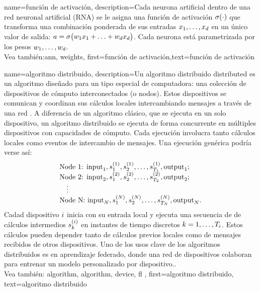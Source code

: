 {name={función de activación},
	description={Cada neurona artificial dentro de una red neuronal artificial (RNA) se le asigna 
		una función de activación $\sigma(\cdot)$ que transforma una combinación ponderada de 
		sus entradas $x_{1},\ldots,x_{d}$ en un único valor de salida: 
		$a = \sigma\big(w_{1} x_{1}+\ldots+w_{d} x_{d} \big)$. 
		Cada neurona está parametrizada por los pesos $w_{1},\ldots,w_{d}$.
		\\
		 Vea también:\gls{ann}, \gls{weights}},
first={función de activación},text={función de activación} 
}

{name={algoritmo distribuido},
	description={Un algoritmo distribuido distributed es un algoritmo diseñado para 
		un tipo especial de computadora: una colección de dispositivos de cómputo interconectados (o nodos). 
		Estos dispositivos se comunican y coordinan sus cálculos locales intercambiando mensajes
		a través de una red \cite{IntroDistAlg,ParallelDistrBook}. A diferencia de un algoritmo clásico,
		que se ejecuta en un solo dispositivo, un algoritmo distribuido   
		se ejecuta de forma concurrente en múltiples dispositivos con capacidades de cómputo. 
		Cada ejecución involucra tanto cálculos locales como eventos de intercambio de mensajes. 
		Una ejecución genérica podría verse así: 
		\[
		\begin{array}{l}
			\text{Node 1: } {\rm input}_1, s_1^{(1)}, s_2^{(1)}, \ldots, s_{T_1}^{(1)}, {\rm output}_1; \\
			\text{Node 2: } {\rm input}_2, s_1^{(2)}, s_2^{(2)}, \ldots, s_{T_2}^{(2)}, {\rm output}_2; \\
			\quad \vdots \\
			\text{Node N: } {\rm input}_N, s_1^{(N)}, s_2^{(N)}, \ldots, s_{T_N}^{(N)}, {\rm output}_N.
		\end{array}
		\]
		Cadad dispositivo  $i$ inicia con su entrada local y ejecuta una secuencia de 
		de cálculos intermedios $s_{k}^{(i)}$ en instantes de tiempo discretos $k = 1, \dots, T_i$. 
		Estos cálculos pueden depender tanto de cálculos previos locales como de mensajes recibidos de otros dispositivos.
		Uno de los usos clave de los algoritmos distribuidos es en aprendizaje federado, donde una red de 
		dispositivos colaboran para entrenar un modelo personalizado por dispositivo.. 
		\\
		 Vea también: \gls{algorithm}, \gls{algorithm}, \gls{device}, \gls{fl}  },
	first={algoritmo distribuido}, text={algoritmo distribuido}
}



